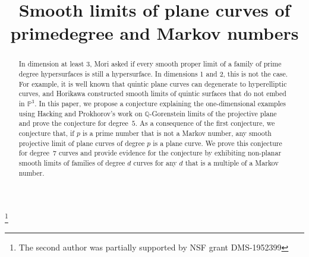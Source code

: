 \documentclass[JEP,XML,SOM,Unicode,NoFloatCountersInSection,published]{cedram}
\theoremstyle{plain}
\theoremstyle{definition}
\begin{document}
\frontmatter
\title{Smooth limits of plane curves of prime\nobreakspace degree and Markov numbers}

\author[\initial{K.} \lastname{DeVleming}]{ }
\address{Department of Mathematics, University of Massachusetts,\\
Amherst, MA 01003, USA}

\author[\initial{D.} \lastname{Stapleton}]{ }
\address{Mathematics Department, University of Michigan,\\
Ann Arbor, MI 48109, USA}

\thanks{The second author was partially supported by NSF grant DMS-1952399}


\begin{abstract}
In dimension at least 3, Mori asked if every smooth proper limit of a family of prime degree hypersurfaces is still a hypersurface. In dimensions 1 and 2, this is not the case. For example, it is well known that quintic plane curves can degenerate to hyperelliptic curves, and Horikawa constructed smooth limits of quintic surfaces that do not embed in $\mathbb{P}^3$. In this paper, we propose a conjecture explaining the one-dimensional examples using Hacking and Prokhorov's work on $\mathbb{Q}$-Gorenstein limits of the projective plane and prove the conjecture for degree~$5$. As a consequence of the first conjecture, we conjecture that, if $p$ is a prime number that is not a Markov number, any smooth projective limit of plane curves of degree $p$ is a plane curve. We prove this conjecture for degree~$7$ curves and provide evidence for the conjecture by exhibiting non-planar smooth limits of families of degree $d$ curves for any $d$ that is a multiple of a Markov number.
\end{abstract}




\end{document}
